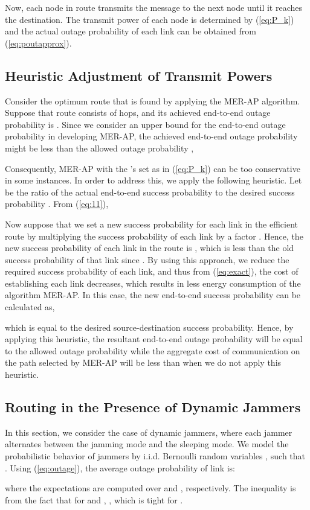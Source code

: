 \documentclass[10pt,journal]{IEEEtran}
\theoremstyle{definition}
\begin{document}
Now, each node in route  transmits the message to the next node until it reaches the destination. The transmit power of each node is determined by (\ref{eq:P_k}) and the actual  outage probability of each link can be obtained from (\ref{eq:poutapprox}). 

\subsection{Heuristic Adjustment of Transmit Powers}
Consider the optimum route  that is found by applying the MER-AP algorithm. Suppose that route   consists of  hops, 
 and   its achieved end-to-end outage probability is .
Since we consider an upper bound for the end-to-end outage probability in developing MER-AP, the achieved end-to-end outage probability  might be less than the allowed outage probability , 

Consequently, MER-AP  with the 's set as in (\ref{eq:P_k}) can be too conservative  in some instances.
In order to address this, we apply the following heuristic.
Let  be the ratio of the actual end-to-end success probability   to the desired success probability . 
From (\ref{eq:11}),

Now suppose that we set  a new  success probability for each link in the efficient route by multiplying the success probability of each link by a factor  . 
Hence, the new success probability of each link in the  route is , which is less than the old success probability of that link since . 
By using this approach,  we reduce the required success probability of each link, and thus from (\ref{eq:exact}), the cost of establishing each link decreases, which results in less energy consumption of the algorithm MER-AP.
In this case, the new end-to-end success probability can be calculated as,

which is equal to the desired source-destination success probability. 
Hence, by applying this heuristic, the resultant end-to-end outage probability will be equal to the allowed outage probability while the aggregate cost of communication on the path selected by MER-AP will be less than when we do not apply this heuristic.


	
\subsection{Routing in the Presence of Dynamic Jammers}
 In this section, we consider the case of dynamic jammers, where each jammer alternates between the jamming mode and the sleeping mode. We model the probabilistic behavior of  jammers by  i.i.d. Bernoulli random variables , such that . 
 Using (\ref{eq:outage}), the average outage probability of  link  is:
\begin{small}
 
\end{small}
where the expectations are computed over  and , respectively. 
The inequality is from the fact that for  and , , which    is tight for . 
\end{document}
